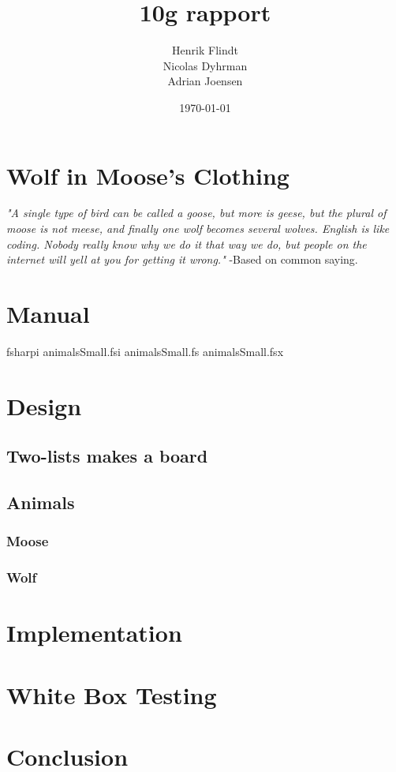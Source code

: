 \documentclass{article}
\title{10g rapport}
\author{Henrik Flindt\\Nicolas Dyhrman\\Adrian Joensen}
\date{\today}
\begin{document}
    \maketitle
    
    \section*{Wolf in Moose's Clothing}
    \textit{"A single type of bird can be called a goose, but more is geese, but the plural of moose is not meese, and finally one wolf becomes several wolves. English is like coding. Nobody really know why we do it that way we do, but people on the internet will yell at you for getting it wrong."} \newline -Based on common saying.
    \section{Manual}
   		fsharpi animalsSmall.fsi animalsSmall.fs animalsSmall.fsx
    
    \section{Design}
    \subsection{Two-lists makes a board}
    \subsection{Animals}
    \subsubsection{Moose}
    \subsubsection{Wolf}    

    \section{Implementation}
       
         
    \section{White Box Testing}
   	   
    \section{Conclusion}
     
\end{document}
